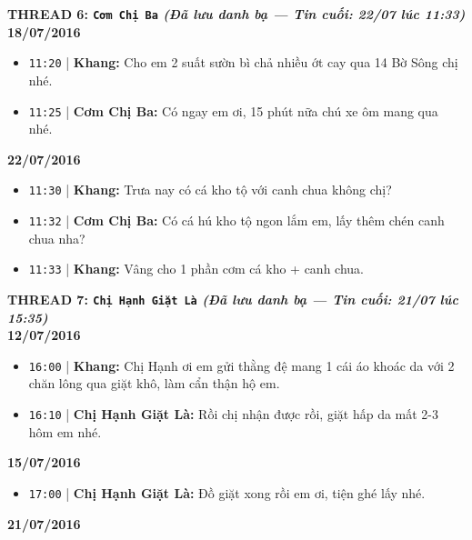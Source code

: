 \documentclass[12pt,a4paper]{article}
\begin{document}
\vspace{0.3cm}\noindent\textbf{\large  THREAD 6: \texttt{Cơm Chị Ba} \textit{(Đã lưu danh bạ — Tin cuối: 22/07 lúc 11:33)}}\\[0.15cm]


\textbf{18/07/2016}

\begin{itemize}[leftmargin=*, itemsep=2pt, topsep=2pt, parsep=0pt]
  \item \texttt{11:20} | \textbf{Khang:} Cho em 2 suất sườn bì chả nhiều ớt cay qua 14 Bờ Sông chị nhé.
  \item \texttt{11:25} | \textbf{Cơm Chị Ba:} Có ngay em ơi, 15 phút nữa chú xe ôm mang qua nhé.

\end{itemize}
\textbf{22/07/2016}

\begin{itemize}[leftmargin=*, itemsep=2pt, topsep=2pt, parsep=0pt]
  \item \texttt{11:30} | \textbf{Khang:} Trưa nay có cá kho tộ với canh chua không chị?
  \item \texttt{11:32} | \textbf{Cơm Chị Ba:} Có cá hú kho tộ ngon lắm em, lấy thêm chén canh chua nha?
  \item \texttt{11:33} | \textbf{Khang:} Vâng cho 1 phần cơm cá kho + canh chua.


\end{itemize}

\vspace{0.3cm}\noindent\textbf{\large  THREAD 7: \texttt{Chị Hạnh Giặt Là} \textit{(Đã lưu danh bạ — Tin cuối: 21/07 lúc 15:35)}}\\[0.15cm]


\textbf{12/07/2016}

\begin{itemize}[leftmargin=*, itemsep=2pt, topsep=2pt, parsep=0pt]
  \item \texttt{16:00} | \textbf{Khang:} Chị Hạnh ơi em gửi thằng đệ mang 1 cái áo khoác da với 2 chăn lông qua giặt khô, làm cẩn thận hộ em.
  \item \texttt{16:10} | \textbf{Chị Hạnh Giặt Là:} Rồi chị nhận được rồi, giặt hấp da mất 2-3 hôm em nhé.

\end{itemize}
\textbf{15/07/2016}

\begin{itemize}[leftmargin=*, itemsep=2pt, topsep=2pt, parsep=0pt]
  \item \texttt{17:00} | \textbf{Chị Hạnh Giặt Là:} Đồ giặt xong rồi em ơi, tiện ghé lấy nhé.

\end{itemize}
\textbf{21/07/2016}
\end{document}
